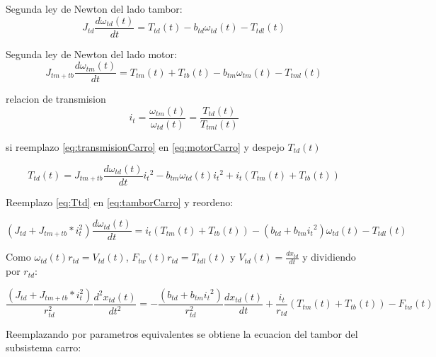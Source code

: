 \documentclass{article}
\begin{document}
            Segunda ley de Newton del lado tambor:
            \begin{equation} \label{eq:tamborCarro}
                J_{td} \frac{d \omega_{td}(t)}{dt} = T_{td}(t) - b_{td} \omega_{td}(t) - T_{tdl}(t)
            \end{equation}

            Segunda ley de Newton del lado motor:
            \begin{equation} \label{eq:motorCarro}
                J_{tm+tb} \frac{d \omega_{tm}(t)}{dt} = T_{tm}(t) + T_{tb}(t) - b_{tm} \omega_{tm}(t) - T_{tml}(t)
            \end{equation}

            relacion de transmision
            \begin{equation} \label{eq:transmisionCarro}
                i_t = \frac{\omega_{tm}(t)}{\omega_{td}(t)} = \frac{T_{td}(t)}{T_{tml}(t)}
            \end{equation}

            si reemplazo \ref{eq:transmisionCarro} en \ref{eq:motorCarro} y despejo $T_{td}(t)$

            \begin{equation} \label{eq:Ttd}
                T_{td}(t) = J_{tm+tb} \frac{d \omega_{td}(t)}{dt} {i_t}^2 - b_{tm} \omega_{td}(t) {i_t}^2 + i_t (T_{tm}(t) + T_{tb}(t))
            \end{equation}

            Reemplazo \ref{eq:Ttd} en \ref{eq:tamborCarro} y reordeno:

            \begin{equation} \label{eq:carroTtdl}
                (J_{td} + J_{tm+tb}*i_t^2) \frac{d \omega_{td}(t)}{dt} = i_t (T_{tm}(t) + T_{tb}(t)) - (b_{td} + b_{tm}{i_t}^2) \omega_{td}(t) - T_{tdl}(t)
            \end{equation}
        
            Como $\omega_{td}(t) r_{td} = V_{td}(t)$, $F_{tw}(t)r_{td} = T_{tdl}(t)$ y $V_{td}(t) = \frac{d x_{td}}{dt}$ y dividiendo por $r_{td}$:
            
            \begin{equation} \label{eq:carroFtw}
                \frac{(J_{td} + J_{tm+tb}*i_t^2)}{r_{td}^2} \frac{d^2 x_{td}(t)}{dt^2} = - \frac{(b_{td} + b_{tm}{i_t}^2)}{r_{td}^2} \frac{d x_{td}(t)}{dt} + \frac{i_t}{r_{td}} (T_{tm}(t) + T_{tb}(t)) - F_{tw}(t)
            \end{equation}

            Reemplazando por parametros equivalentes se obtiene la ecuacion del tambor del subsistema carro:
\end{document}
